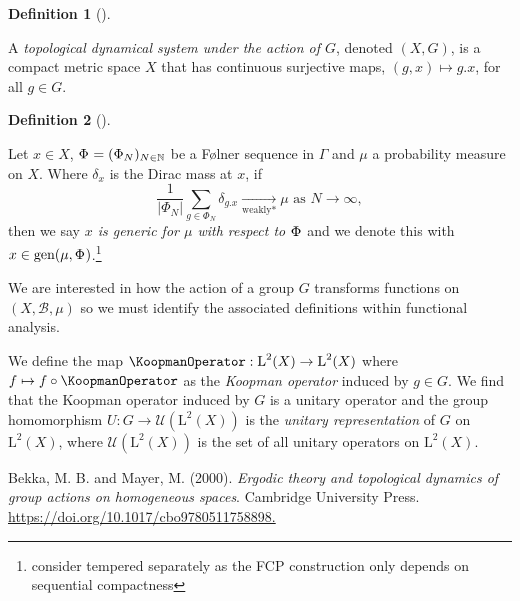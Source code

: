 \documentclass[
  british,
]{article}
\newlength{\cslhangindent}
\newenvironment{CSLReferences}[2] %
 {\begin{list}{}{%
  \setlength{\itemindent}{0pt}
  \setlength{\leftmargin}{0pt}
  \setlength{\parsep}{0pt}
  \ifodd #1
   \setlength{\leftmargin}{\cslhangindent}
   \setlength{\itemindent}{-1\cslhangindent}
  \fi
  \setlength{\itemsep}{#2\baselineskip}}}
 {\end{list}}
\theoremstyle{definition}
\newtheorem{definition}{Definition}[section]
\theoremstyle{remark}
\newcommand{\Folner}[1][{\vphantom{}}]{{\Phi}_{#1}}
\newcommand{\Measure}{{\mu}}
\newcommand{\GroupAction}[2]{{#1}.{#2}}
\newcommand{\GroupElement}{{g}}
\newcommand{\SigmaAlgebra}[1]{{\mathscr{#1}}}
\newcommand{\Group}{{G}}
\begin{document}
\begin{definition}[]\protect\hypertarget{def-topologicalDynamicalSystem}{}\label{def-topologicalDynamicalSystem}

A \emph{topological dynamical system under the action of \(\Group\)},
denoted \((X,\Group)\), is a compact metric space \(X\) that has
continuous surjective maps,
\((\GroupElement,x)\mapsto \GroupAction{\GroupElement}{x}\), for all
\(\GroupElement\in\Group\).

\end{definition}

\begin{definition}[]\protect\hypertarget{def-generic}{}\label{def-generic}

Let \(x\in X\), \(\Folner=(\Folner[N])_{N\in\mathbb{N}}\) be a Følner
sequence in \(\Gamma\) and \(\Measure\) a probability measure on \(X\).
Where \(\delta_x\) is the Dirac mass at \(x\), if
\[\frac{1}{|\Folner[N]|}\sum_{\GroupElement\in\Folner[N]}\delta_{\GroupAction{\GroupElement}{x}}\underset{\text{weakly*}}{\longrightarrow} \Measure \text{ as }N\rightarrow\infty, \]
then we say \emph{\(x\) is generic for \(\Measure\) with respect to
\(\Folner\)} and we denote this with
\(x\in\text{gen}(\Measure,\Folner)\).\footnote{consider tempered
  separately as the FCP construction only depends on sequential
  compactness}

\end{definition}

We are interested in how the action of a group \(\Group\) transforms
functions on \((X,\SigmaAlgebra{B},\Measure)\) so we must identify the
associated definitions within functional analysis.

We define the map
\(\KoopmanOperator:\text{L}^2(X)\rightarrow\text{L}^2(X)\) where
\(f\mapsto f\circ \KoopmanOperator\) as the \emph{Koopman operator}
induced by \(\GroupElement\in\Group\). We find that the Koopman operator
induced by \(\Group\) is a unitary operator and the group homomorphism
\(U:\Group\rightarrow\mathscr{U}(\text{L}^2(X))\) is the \emph{unitary
representation} of \(\Group\) on \(\text{L}^2(X)\), where
\(\mathscr{U}(\text{L}^2(X))\) is the set of all unitary operators on
\(\text{L}^2(X)\).

\label{refs}
\begin{CSLReferences}{1}{0}
Bekka, M. B. and Mayer, M. (2000). \emph{Ergodic theory and topological
dynamics of group actions on homogeneous spaces}. Cambridge University
Press.
\href{https://doi.org/10.1017/cbo9780511758898}{https://doi.org/10.1017/cbo9780511758898.}

\end{CSLReferences}
\end{document}
